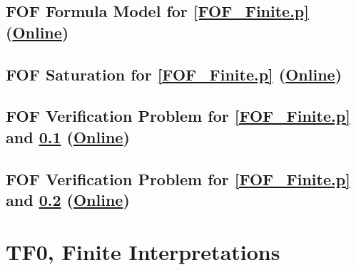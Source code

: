 \documentclass{easychair}
\begin{document}
\newpage
\subsection{FOF Formula Model for \ref{FOF_Finite.p}
(\href{https://raw.githubusercontent.com/GeoffsPapers/InterpretationFormat/master/Examples/FOF_Formulae.s}{Online})}
\label{FOF_Formulae.s}
\begin{small}

\end{small}

\newpage
\subsection{FOF Saturation for \ref{FOF_Finite.p}
(\href{https://raw.githubusercontent.com/GeoffsPapers/InterpretationFormat/master/Examples/FOF_Saturation.s}{Online})}
\label{FOF_Saturation.s}
\begin{small}

\end{small}

\newpage
\subsection{FOF Verification Problem for \ref{FOF_Finite.p} and \ref{FOF_Formulae.s}
(\href{https://raw.githubusercontent.com/GeoffsPapers/InterpretationFormat/master/Examples/FOF_Formulae.s.p}{Online})}
\label{FOF_Formulae.s.p}
\begin{small}

\end{small}

\newpage
\subsection{FOF Verification Problem for \ref{FOF_Finite.p} and \ref{FOF_Saturation.s}
(\href{https://raw.githubusercontent.com/GeoffsPapers/InterpretationFormat/master/Examples/FOF_Saturation.s.p}{Online})}
\label{FOF_Saturation.s.p}
\begin{small}

\end{small}

\newpage
\section{TF0, Finite Interpretations}
\label{TF0Finite}
\end{document}
